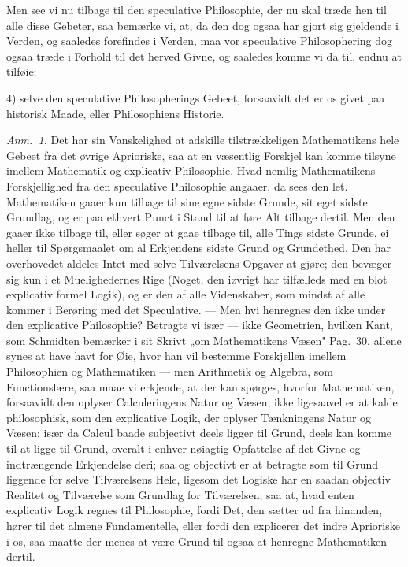 \documentclass[12pt,a4paper]{book}
\begin{document}
Men see vi nu tilbage til den speculative Philosophie, der nu skal træde hen til
alle disse Gebeter, saa bemærke vi, at, da den dog ogsaa har gjort sig gjeldende i
Verden, og saaledes forefindes i Verden, maa vor speculative Philosophering dog
ogsaa træde i Forhold til det herved Givne, og saaledes komme vi da til, endnu at
tilføie:

4) selve den speculative Philosopherings Gebeet, forsaavidt det er os givet paa
historisk Maade, eller Philosophiens Historie.

{\small\emph{Anm.~1.} Det har sin Vanskelighed at adskille tilstrækkeligen
Mathematikens hele Gebeet fra det øvrige Aprioriske, saa at en væsentlig Forskjel
kan komme tilsyne imellem Mathematik og explicativ Philosophie. Hvad nemlig
Mathematikens Forskjellighed fra den speculative Philosophie angaaer, da sees den
let. Mathematiken gaaer kun tilbage til sine egne sidste Grunde, sit eget sidste
Grundlag, og er paa ethvert Punct i Stand til at føre Alt tilbage dertil. Men den
gaaer ikke tilbage til, eller søger at gaae tilbage til, alle Tings sidste Grunde,
ei heller til Spørgsmaalet om al Erkjendens sidste Grund og Grundethed. Den har
overhovedet aldeles Intet med selve Tilværelsens Opgaver at gjøre; den bevæger sig
kun i et Muelighedernes Rige (Noget, den iøvrigt har tilfælleds med en blot
explicativ formel Logik), og er den af alle Videnskaber, som mindst af alle kommer
i Berøring med det Speculative. --- Men hvi henregnes den ikke under den explicative
Philosophie? Betragte vi især --- ikke Geometrien, hvilken Kant, som Schmidten
bemærker i sit Skrivt „om Mathematikens Væsen" Pag.\ 30, allene synes at have havt
for Øie, hvor han vil bestemme Forskjellen imellem Philosophien og Mathematiken ---
men Arithmetik og Algebra, som Functionslære, saa maae vi erkjende, at der kan
spørges, hvorfor Mathematiken, forsaavidt den oplyser Calculeringens Natur og
Væsen, ikke ligesaavel er at kalde philosophisk, som den explicative Logik, der
oplyser Tænkningens Natur og Væsen; især da Calcul baade subjectivt deels ligger
til Grund, deels kan komme til at ligge til Grund, overalt i enhver nøiagtig
Opfattelse af det Givne og indtrængende Erkjendelse deri; saa og objectivt er at
betragte som til Grund liggende for selve Tilværelsens Hele, ligesom det Logiske har
en saadan objectiv Realitet og Tilværelse som Grundlag for Tilværelsen; saa at, hvad
enten explicativ Logik regnes til Philosophie, fordi Det, den sætter ud fra
hinanden, hører til det almene Fundamentelle, eller fordi den explicerer det indre
Aprioriske i os, saa maatte der menes at være Grund til ogsaa at henregne
Mathematiken dertil.\par}
\end{document}
